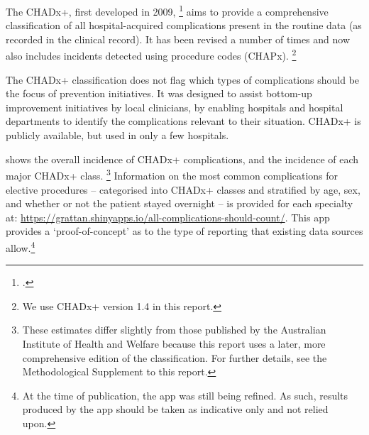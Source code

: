\documentclass[FrontPage]{grattan}
\newcommand*{\ShinyAppURL}{\textcolor{blue}{\url{https://grattan.shinyapps.io/all-complications-should-count/}}}
\begin{document}
The CHADx+, first developed in 2009,
	\footcite{jackson2009classification}
aims to provide a comprehensive classification of all hospital-acquired complications present in the routine data (as recorded in the clinical record).
It has been revised a number of times and now also includes incidents detected using procedure codes (CHAPx).%
	\footnote{We use CHADx+ version 1.4 in this report.}

The CHADx+ classification does not flag which types of complications should be the focus of prevention initiatives.
It was designed to assist bottom-up improvement initiatives by local clinicians, by enabling hospitals and hospital departments to identify the complications relevant to their situation.
CHADx+ is publicly available, but used in only a few hospitals.

 shows the overall incidence of CHADx+ complications, and the incidence of each major CHADx+ class.%
	\footnote{These estimates differ slightly from those published by the Australian Institute of Health and Welfare because this report uses a later, more comprehensive edition of the classification.
	For further details, see the Methodological Supplement to this report.}
Information on the most common complications for elective procedures -- categorised into CHADx+ classes and stratified by age, sex, and whether or not the patient stayed overnight -- is provided for each specialty at: \ShinyAppURL{}. This app provides a `proof-of-concept' as to the type of reporting that existing data sources allow.\footnote{At the time of publication, the app was still being refined. As such, results produced by the app should be taken as indicative only and not relied upon.}  
\end{document}
